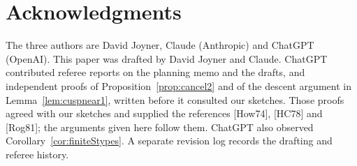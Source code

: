 \documentclass[12pt]{article}
\theoremstyle{plain}
\theoremstyle{definition}
\begin{document}
\section*{Acknowledgments}
The three authors are David Joyner, Claude (Anthropic) and ChatGPT (OpenAI). This paper was drafted by David Joyner and Claude. ChatGPT contributed referee reports on the planning memo and the drafts, and independent proofs of Proposition~\ref{prop:cancel2} and of the descent argument in Lemma~\ref{lem:cuspnear1}, written before it consulted our sketches. Those proofs agreed with our sketches and supplied the references [How74], [HC78] and [Rog81]; the arguments given here follow them. ChatGPT also observed Corollary~\ref{cor:finiteStypes}. A separate revision log records the drafting and referee history.

\end{document}
